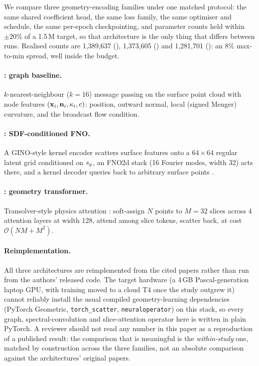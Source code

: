 We compare three geometry-encoding families under one matched protocol: the
same shared coefficient head, the same loss family, the same optimiser and
schedule, the same per-epoch checkpointing, and parameter counts held within
$\pm20\%$ of a 1.5\,M target, so that architecture is the only thing that
differs between runs. Realised counts are
1{,}389{,}637 (\Mgnn), 1{,}373{,}605 (\Mfno) and
1{,}281{,}701 (\Mtrans): an $8\%$ max-to-min spread, well inside the budget.

\paragraph{\Mgnn: graph baseline.} $k$-nearest-neighbour ($k=16$) message
passing on the surface point cloud with node features $(\mathbf{x}_i, \mathbf{n}_i, \kappa_i,
c)$: position, outward normal, local (signed Menger) curvature, and the
broadcast flow condition.

\paragraph{\Mfno: SDF-conditioned FNO.} A GINO-style kernel encoder scatters
surface features onto a $64\times64$ regular latent grid conditioned on
$s_{g}$, an FNO2d stack (16 Fourier modes, width 32) acts there, and a kernel
decoder queries back to arbitrary surface points \citep{li2023gino, li2021fno}.

\paragraph{\Mtrans: geometry transformer.} Transolver-style physics attention
\citep{wu2024transolver}: soft-assign $N$ points to $M=32$ slices across 4
attention layers at width 128, attend among slice tokens, scatter back, at cost
$\mathcal{O}(NM + M^2)$.

\paragraph{Reimplementation.} All three architectures are reimplemented from
the cited papers rather than run from the authors' released code. The target
hardware (a 4\,GB Pascal-generation laptop GPU, with training moved to a cloud
T4 once the study outgrew it) cannot reliably install the usual compiled
geometry-learning dependencies (PyTorch Geometric, \texttt{torch\_scatter},
\texttt{neuraloperator}) on this stack, so every graph, spectral-convolution and
slice-attention operator here is written in plain PyTorch. A reviewer should
not read any number in this paper as a reproduction of a published result:
the comparison that is meaningful is the \emph{within-study} one, matched by
construction across the three families, not an absolute comparison against the
architectures' original papers.

